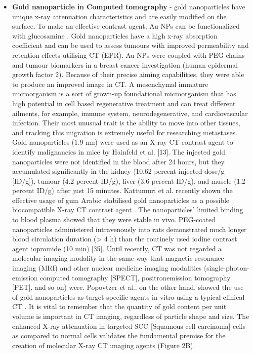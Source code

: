 \documentclass[12pt]{article}
\begin{document}
\begin{itemize}
    \item \textbf{ Gold nanoparticle in Computed tomography} - gold nanoparticles have unique x-ray attenuation characteristics and are easily modified on the surface. To make an effective contrast agent, Au NPs can be functionalized with glucosamine . Gold nanoparticles have a high x-ray absorption coefficient and can be used to assess tumours with improved permeability and retention effects utilising CT (EPR). Au NPs were coupled with PEG chains and tumour biomarkers in a breast cancer investigation (human epidermal growth factor 2). Because of their precise aiming capabilities, they were able to produce an improved image in CT. A mesenchymal immature microorganism is a
sort of grown-up foundational microorganism that has high potential in cell based regenerative treatment and can treat different ailments, for example, immune system, neurodegenerative, and cardiovascular infection. Their most unusual trait is the ability to move into other tissues, and tracking this migration is extremely useful for researching metastases. Gold nanoparticles (1.9 nm) were used as an X-ray CT contrast agent to identify malignancies in mice by Hainfeld et al. [13].
The injected gold nanoparticles were not identified in the blood after 24 hours, but they accumulated significantly in the kidney (10.62 percent injected dose/g [ID/g]), tumour (4.2 percent ID/g), liver (3.6 percent ID/g), and muscle (1.2 percent ID/g) after just 15 minutes. Kattumuri et al. recently shown the effective usage of gum Arabic stabilised gold nanoparticles as a possible biocompatible X-ray CT contrast agent . The nanoparticles' limited binding to blood plasma showed that they were stable in vivo. PEG-coated nanoparticles administered intravenously into rats demonstrated much longer blood circulation duration (> 4 h) than the routinely used iodine contrast agent iopromide (10 min) [35]. Until recently, CT was not regarded a molecular imaging modality in the same way that magnetic resonance imaging (MRI) and other nuclear medicine imaging modalities (single-photon-emission computed tomography [SPECT], positronemission tomography [PET], and so on) were.
Popovtzer et al., on the other hand, showed the use of gold nanoparticles as target-specific agents in vitro using a typical clinical CT . It is vital to remember that the quantity of gold content per unit volume is important in CT imaging, regardless of particle shape and size. The enhanced X-ray attenuation in targeted SCC [Squamous cell carcinoma] cells as compared to normal cells validates the fundamental premise for the creation of molecular X-ray CT imaging agents (Figure 2B).

\end{itemize}
\end{document}
